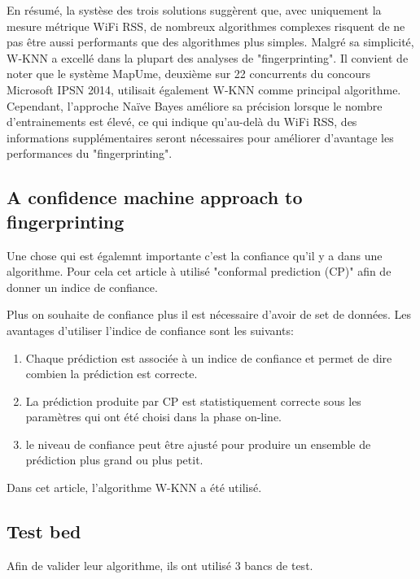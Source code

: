 En résumé, la systèse des trois solutions suggèrent que, avec uniquement la mesure métrique WiFi RSS, de nombreux algorithmes complexes risquent de ne pas être aussi performants que des algorithmes plus simples. Malgré sa simplicité, W-KNN a excellé dans la plupart des analyses de "fingerprinting". Il convient de noter que le système MapUme, deuxième sur 22 concurrents du concours Microsoft IPSN 2014, utilisait également W-KNN comme principal algorithme. Cependant, l'approche Naïve Bayes améliore sa précision lorsque le nombre d'entrainements est élevé, ce qui indique qu'au-delà du WiFi RSS, des informations supplémentaires seront nécessaires pour améliorer d'avantage les performances du "fingerprinting".


\subsection{A confidence machine approach to fingerprinting}
Une chose qui est égalemnt importante c'est la confiance qu'il y a dans une algorithme. Pour cela cet article à utilisé "conformal prediction (CP)" afin de donner un indice de confiance.

Plus on souhaite de confiance plus il est nécessaire d'avoir de set de données. Les avantages d'utiliser l'indice de confiance sont les suivants:

\begin{enumerate}
	\item Chaque prédiction est associée à un indice de confiance et permet de dire combien la prédiction est correcte. 
	\item La prédiction produite par CP est statistiquement correcte sous les paramètres qui ont été choisi dans la phase on-line.
	\item le niveau de confiance peut être ajusté pour produire un ensemble de prédiction plus grand ou plus petit.
\end{enumerate}

Dans cet article, l'algorithme W-KNN a été utilisé.

\subsection{Test bed}
Afin de valider leur algorithme, ils ont utilisé 3 bancs de test. 

